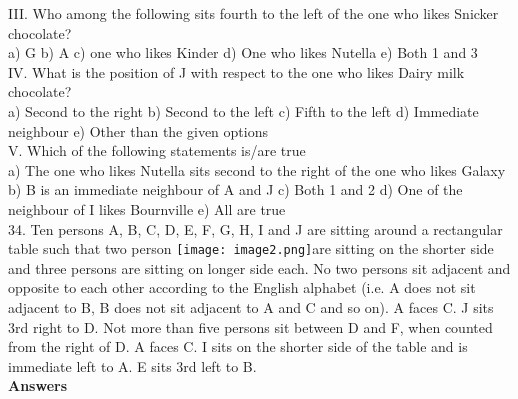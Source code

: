 \documentclass[
]{article}
\begin{document}
III. Who among the following sits fourth to the left of the one who likes Snicker chocolate?\\
a) G \hspace{2mm}b) A \hspace{2mm}c) one who likes Kinder \hspace{2mm}d) One who likes Nutella
\hspace{2mm}e) Both 1 and 3\\

IV. What is the position of J with respect to the one who likes Dairy milk chocolate?\\
a) Second to the right \hspace{2mm}b) Second to the left\hspace{2mm} c) Fifth to the left
\hspace{2mm}d) Immediate neighbour \hspace{2mm}e) Other than the given options\\

V. Which of the following statements is/are true\\
a) The one who likes Nutella sits second to the right of the one who likes Galaxy
\hspace{2mm}b) B is an immediate neighbour of A and J
\hspace{2mm}c) Both 1 and 2
\hspace{2mm}d) One of the neighbour of I likes Bournville
\hspace{2mm}e) All are true\\

34. Ten persons A, B, C, D, E, F, G, H, I and J are sitting around a rectangular table such that
two person \texttt{[image: image2.png]}are sitting on the shorter side and three persons are sitting on longer side each.
No two persons sit adjacent and opposite to each other according to the English alphabet
(i.e. A does not sit adjacent to B, B does not sit adjacent to A and C and so on). A faces C. J
sits 3rd right to D. Not more than five persons sit between D and F, when counted from the
right of D. A faces C. I sits on the shorter side of the table and is immediate left to A. E sits
3rd left to B.\\

\textbf{Answers}\\
\end{document}
